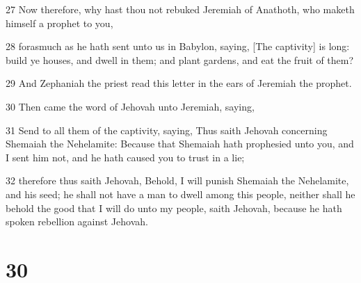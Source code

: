 \par 27 Now therefore, why hast thou not rebuked Jeremiah of Anathoth, who maketh himself a prophet to you,
\par 28 forasmuch as he hath sent unto us in Babylon, saying, [The captivity] is long: build ye houses, and dwell in them; and plant gardens, and eat the fruit of them?
\par 29 And Zephaniah the priest read this letter in the ears of Jeremiah the prophet.
\par 30 Then came the word of Jehovah unto Jeremiah, saying,
\par 31 Send to all them of the captivity, saying, Thus saith Jehovah concerning Shemaiah the Nehelamite: Because that Shemaiah hath prophesied unto you, and I sent him not, and he hath caused you to trust in a lie;
\par 32 therefore thus saith Jehovah, Behold, I will punish Shemaiah the Nehelamite, and his seed; he shall not have a man to dwell among this people, neither shall he behold the good that I will do unto my people, saith Jehovah, because he hath spoken rebellion against Jehovah.

\chapter{30}

